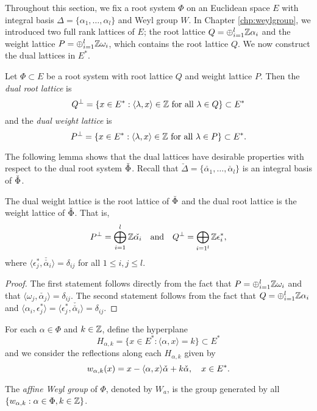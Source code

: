 Throughout this section, we fix a root system $\Phi$ on an Euclidean space $E$ with integral basis $\Delta=\{\alpha_1,\ldots,\alpha_l\}$ and Weyl group $W$. In Chapter \ref{chp:weylgroup}, we introduced two full rank lattices of $E$; the root lattice $Q=\oplus_{i=1}^l\mathbb{Z}\alpha_i$ and the weight lattice $P=\oplus_{i=1}^l\mathbb{Z}\omega_i$, which contains the root lattice $Q$. We now construct the dual lattices in $E^*$.

\begin{definition}
    Let $\Phi\subset E$ be a root system with root lattice $Q$ and weight lattice $P$. Then the \textit{dual root lattice} is 
    $$Q^\perp=\{x\in E^*:\langle\lambda,x\rangle\in\mathbb{Z}\text{ for all }\lambda\in Q\}\subset E^*$$
    and the \textit{dual weight lattice} is 
    $$P^\perp=\{x\in E^*:\langle\lambda,x\rangle\in\mathbb{Z}\text{ for all }\lambda\in P\}\subset E^*.$$
\end{definition}

The following lemma shows that the dual lattices have desirable properties with respect to the dual root system $\check{\Phi}$. Recall that $\check{\Delta}=\{\check{\alpha_1},\ldots,\check{\alpha_l}\}$ is an integral basis of $\check{\Phi}$.

\begin{lemma}
    The dual weight lattice is the root lattice of $\check{\Phi}$ and the dual root lattice is the weight lattice of $\check{\Phi}$. That is,
    $$P^\perp=\bigoplus_{i=1}^l\mathbb{Z}\check{\alpha_i}\quad\text{and}\quad Q^\perp=\bigoplus_{i=1^l}\mathbb{Z}\epsilon_i^*,$$
    where $\langle\epsilon_j^*,\check{\check{\alpha_i}}\rangle=\delta_{ij}$ for all $1\leq i,j\leq l$.
\end{lemma}
\begin{proof}
    The first statement follows directly from the fact that $P=\oplus_{i=1}^l\mathbb{Z}\omega_i$ and that $\langle\omega_j,\check{\alpha_j}\rangle=\delta_{ij}$. The second statement follows from the fact that $Q=\oplus_{i=1}^l\mathbb{Z}\alpha_i$ and $\langle\alpha_i,\epsilon_j^*\rangle=\langle\epsilon_j^*,\check{\check{\alpha_i}}\rangle=\delta_{ij}$.
\end{proof}

For each $\alpha\in\Phi$ and $k\in\mathbb{Z}$, define the hyperplane
$$H_{\alpha,k}=\{x\in E^*:\langle\alpha,x\rangle=k\}\subset E^*$$
and we consider the reflections along each $H_{\alpha,k}$ given by
$$w_{\alpha,k}(x)=x-\langle\alpha,x\rangle\check{\alpha}+k\check{\alpha},\quad x\in E^*.$$
\begin{definition}
    The \textit{affine Weyl group} of $\Phi$, denoted by $W_a$, is the group generated by all $\{w_{\alpha,k}:\alpha\in\Phi, k\in\mathbb{Z}\}$.
\end{definition}


